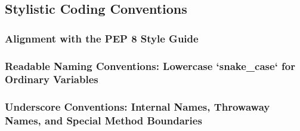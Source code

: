 \subsection{Stylistic Coding Conventions}
\subsubsection{Alignment with the PEP 8 Style Guide}
\subsubsection{Readable Naming Conventions: Lowercase `snake_case` for Ordinary Variables}
\subsubsection{Underscore Conventions: Internal Names, Throwaway Names, and Special Method Boundaries}
